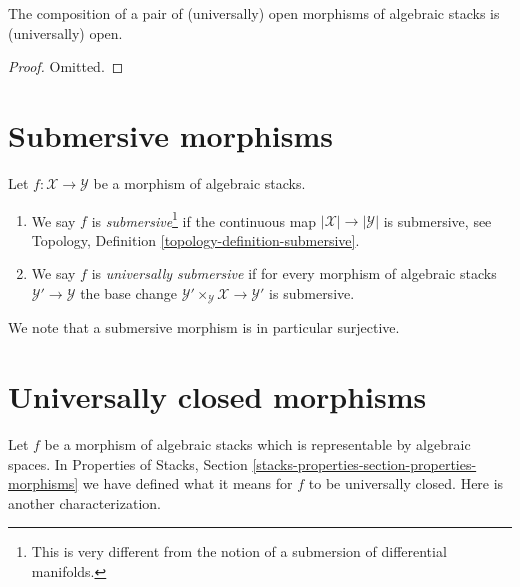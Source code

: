 \begin{lemma}
\label{lemma-composition-universally-open}
The composition of a pair of (universally) open morphisms of
algebraic stacks is (universally) open.
\end{lemma}

\begin{proof}
Omitted.
\end{proof}







\section{Submersive morphisms}
\label{section-submersive}

\begin{definition}
\label{definition-submersive}
Let $f : \mathcal{X} \to \mathcal{Y}$ be a morphism of algebraic stacks.
\begin{enumerate}
\item We say $f$ is {\it submersive}\footnote{This is very different
from the notion of a submersion of differential manifolds.}
if the continuous map $|\mathcal{X}| \to |\mathcal{Y}|$ is submersive, see
Topology, Definition \ref{topology-definition-submersive}.
\item We say $f$ is {\it universally submersive} if for every
morphism of algebraic stacks $\mathcal{Y}' \to \mathcal{Y}$
the base change $\mathcal{Y}' \times_\mathcal{Y} \mathcal{X} \to \mathcal{Y}'$
is submersive.
\end{enumerate}
\end{definition}

\noindent
We note that a submersive morphism is in particular surjective.













\section{Universally closed morphisms}
\label{section-universally-closed}

\noindent
Let $f$ be a morphism of algebraic stacks which is representable by
algebraic spaces. In
Properties of Stacks, Section
\ref{stacks-properties-section-properties-morphisms}
we have defined what it means for $f$ to be universally closed.
Here is another characterization.

